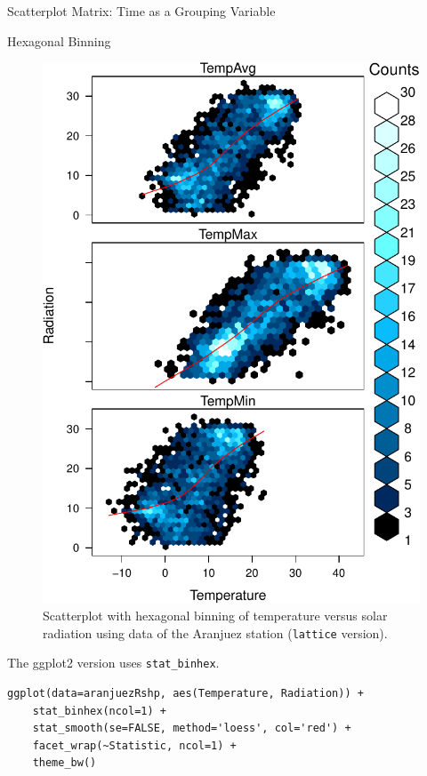 \documentclass[presentation]{beamer}
\begin{document}
\begin{frame}[fragile,label=sec-1]{Scatterplot Matrix: Time as a Grouping Variable}
\begin{block}{Hexagonal Binning}
\begin{figure}[htb]
\centering
\includegraphics[width=.9\linewidth]{figs/aranjuezHexbinplot.pdf}
\caption{\label{fig:aranjuezHexbin}Scatterplot with hexagonal binning of temperature versus solar radiation using data of the Aranjuez station (\texttt{lattice} version).}
\end{figure}

The ggplot2 version uses \texttt{stat\_binhex}.
\lstset{language=R,numbers=none}
\begin{lstlisting}
ggplot(data=aranjuezRshp, aes(Temperature, Radiation)) +
    stat_binhex(ncol=1) + 
    stat_smooth(se=FALSE, method='loess', col='red') +
    facet_wrap(~Statistic, ncol=1) +
    theme_bw()
\end{lstlisting}
\end{block}
\end{frame}
\end{document}

